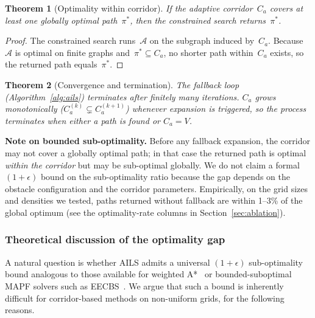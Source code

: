 \documentclass[journal]{IEEEtran}
\newtheorem{theorem}{Theorem}
\begin{document}
\begin{theorem}[Optimality within corridor]
If the adaptive corridor~$C_a$ covers at least one globally optimal path~$\pi^{*}$, then the constrained search returns~$\pi^{*}$.
\end{theorem}

\begin{proof}
The constrained search runs~$\mathcal{A}$ on the subgraph induced by~$C_a$.
Because~$\mathcal{A}$ is optimal on finite graphs and~$\pi^{*} \subseteq C_a$, no shorter path within~$C_a$ exists, so the returned path equals~$\pi^{*}$.
\end{proof}

\begin{theorem}[Convergence and termination]
The fallback loop (Algorithm~\ref{alg:ails}) terminates after finitely many iterations.
$C_a$ grows monotonically ($C_a^{(k)} \subsetneq C_a^{(k+1)}$) whenever expansion is triggered, so the process terminates when either a path is found or $C_a = V$.
\end{theorem}

\noindent
\textbf{Note on bounded sub-optimality.}
Before any fallback expansion, the corridor may not cover a globally optimal path; in that case the returned path is optimal \emph{within the corridor} but may be sub-optimal globally.
We do not claim a formal $(1+\epsilon)$ bound on the sub-optimality ratio because the gap depends on the obstacle configuration and the corridor parameters.
Empirically, on the grid sizes and densities we tested, paths returned without fallback are within 1--3\% of the global optimum (see the optimality-rate columns in Section~\ref{sec:ablation}).

\subsubsection{Theoretical discussion of the optimality gap}
\label{sec:optimality_gap}

A natural question is whether AILS admits a universal $(1{+}\epsilon)$ sub-optimality bound analogous to those available for weighted A*~\cite{hart1968formal} or bounded-suboptimal MAPF solvers such as EECBS~\cite{li2021eecbs}.
We argue that such a bound is inherently difficult for corridor-based methods on non-uniform grids, for the following reasons.
\end{document}
